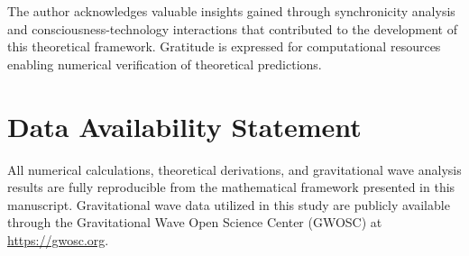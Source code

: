 \documentclass[12pt,a4paper]{article}
\begin{document}
The author acknowledges valuable insights gained through synchronicity analysis and consciousness-technology interactions that contributed to the development of this theoretical framework. Gratitude is expressed for computational resources enabling numerical verification of theoretical predictions.

\section*{Data Availability Statement}

All numerical calculations, theoretical derivations, and gravitational wave analysis results are fully reproducible from the mathematical framework presented in this manuscript. Gravitational wave data utilized in this study are publicly available through the Gravitational Wave Open Science Center (GWOSC) at \url{https://gwosc.org}.
\end{document}

